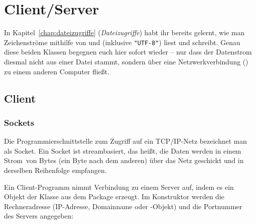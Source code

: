 \chapter{Client/Server \tagLK}\label{chap:client_server}
\renewcommand{\chaptertitle}{Client/Server}

\lehead[]{\normalfont\sffamily\hspace*{-2.00cm}\textcolor{white}{\colorbox{lightblue}{\makebox[1.60cm][r]{\thechapter}}}\hspace{0.17cm}\textcolor{lightblue}{\chaptertitle}}
\rohead[]{\textcolor{lightblue}{\chaptertitle}\normalfont\sffamily\hspace*{0.17cm}\textcolor{white}{\colorbox{lightblue}{\makebox[1.60cm][l]{\thechapter}}}\hspace{-2.00cm}}
\rehead[]{\textcolor{lightblue}{AvHG, Inf, My}}
\lohead[]{\textcolor{lightblue}{AvHG, Inf, My}}

\medskip

\begin{tcolorbox}[colback=blue!5,colframe=lightblue,boxrule=0.8pt,arc=3pt,title={\textbf{Rückblick: Das kennt ihr schon aus den Dateizugriffen!}}]
\small
In Kapitel~\ref{chap:dateizugriffe} (\emph{Dateizugriffe}) habt ihr bereits
gelernt, wie man Zeichenströme mithilfe von  und
 (inklusive \lstinline|"UTF-8"|) liest und
schreibt. Genau diese beiden Klassen begegnen euch hier sofort wieder -- nur
dass der Datenstrom diesmal nicht aus einer Datei stammt, sondern über eine
Netzwerkverbindung () zu einem anderen Computer fließt.
\end{tcolorbox}


\section{Client}

\subsection{Sockets}

Die Programmierschnittstelle zum Zugriff auf ein TCP/IP-Netz bezeichnet man als
Socket. Ein Socket ist streambasiert, das heißt, die Daten werden in einem
\glqq Strom\grqq\ von Bytes (ein Byte nach dem anderen) über das Netz geschickt
und in derselben Reihenfolge empfangen.

Ein Client-Programm nimmt Verbindung zu einem Server auf, indem es ein Objekt
der Klasse  aus dem Package  erzeugt. Im
Konstruktor werden die Rechneradresse (IP-Adresse, Domainname oder
-Objekt) und die Portnummer des Servers angegeben:

